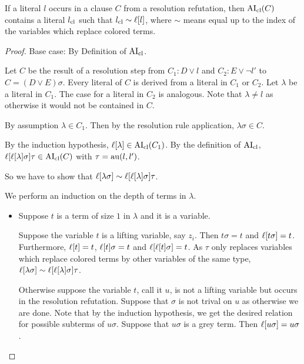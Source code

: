 \documentclass[,%
	paper=a4,%
	twoside=false,%
	liststotoc,
	bibtotoc,
	draft=false,%
	numbers=noendperiod
]{scrartcl}
\begin{document}
\begin{lemma} 
	\label{lemma:literal_in_clause}
	If a literal $l$ occurs in a clause $C$ from a resolution refutation,
	then $\operatorname{AI}_\mathrm{cl}(C)$ contains a literal $l_\mathrm{cl}$ such that $l_\mathrm{cl} \sim \ell[l]$, where $\sim$ means equal up to the index of the variables which replace colored terms.
\end{lemma}
\begin{proof}
	Base case: By Definition of $\operatorname{AI}_\mathrm{cl}$.

	Let $C$ be the result of a resolution step from $C_1: D\lor l$ and $C_2: E\lor \lnot l'$ to $C = (D \lor E)\sigma$.
	Every literal of $C$ is derived from a literal in $C_1$ or $C_2$. Let $\lambda$ be a literal in $C_1$. The case for a literal in $C_2$ is analogous.
	Note that $\lambda \neq l$ as otherwise it would not be contained in $C$.

	By assumption $\lambda \in C_1$. Then by the resolution rule application, $\lambda\sigma \in C$.

	By the induction hypothesis, $\ell[\lambda] \in \operatorname{AI}_\mathrm{cl}(C_1)$.
	By the definition of $\operatorname{AI}_\mathrm{cl}$, $\ell[\ell[\lambda]\sigma]\tau \in \operatorname{AI}_\mathrm{cl}(C)$ 
	with $\tau = \operatorname{au}(l, l')$.

	So we have to show that $\ell[ \lambda \sigma ]  \sim \ell[\ell[\lambda]\sigma]\tau$.

	We perform an induction on the depth of terms in $\lambda$.
	\begin{itemize}
			\item Suppose $t$ is a term of size $1$ in $\lambda$ and  it is a variable.

				Suppose the variable $t$ is a lifting variable, say $z_i$.
				Then $t\sigma = t$ and $\ell[t\sigma] = t$.
				Furthermore, $\ell[t] = t$, $\ell[t]\sigma = t$ and $\ell[\ell[t]\sigma] = t$.
				As $\tau$ only replaces variables which replace colored terms by other variables of the same type, $\ell[\lambda \sigma] \sim \ell[\ell[\lambda]\sigma]\tau$.

				Otherwise suppose the variable $t$, call it $u$, is not a lifting variable but occurs in the resolution refutation. 
				Suppose that $\sigma$ is not trival on $u$ as otherwise we are done.
				Note that by the induction hypothesis, we get the desired relation for possible subterms of $u\sigma$.
				Suppose that $u\sigma$ is a grey term. Then $\ell[u\sigma] = u\sigma$. 


\end{itemize}
\end{proof}
\end{document}
